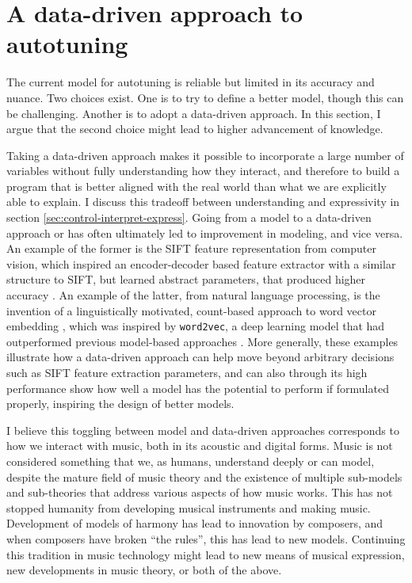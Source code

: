\section{A data-driven approach to autotuning}
\label{sec:pretheory}
The current model for autotuning is reliable but limited in its accuracy and nuance. Two choices exist. One is to try to define a better model, though this can be challenging. Another is to adopt a data-driven approach. In this section, I argue that the second choice might lead to higher advancement of knowledge. 

Taking a data-driven approach makes it possible to incorporate a large number of variables without fully understanding how they interact, and therefore to build a program that is better aligned with the real world than what we are explicitly able to explain. I discuss this tradeoff between understanding and expressivity in section \ref{sec:control-interpret-express}. Going from a model to a data-driven approach or has often ultimately led to improvement in modeling, and vice versa. An example of the former is the SIFT feature representation from computer vision, which inspired an encoder-decoder based feature extractor with a similar structure to SIFT, but learned abstract parameters, that produced higher accuracy \cite{zheng2017sift}. An example of the latter, from natural language processing, is the invention of a linguistically motivated, count-based approach to word vector embedding \cite{pennington2014glove}, which was inspired by \texttt{word2vec}, a deep learning model that had outperformed previous model-based approaches \cite{mikolov2013efficient}. More generally, these examples illustrate how a data-driven approach can help move beyond arbitrary decisions such as SIFT feature extraction parameters, and can also through its high performance show how well a model has the potential to perform if formulated properly, inspiring the design of better models.

I believe this toggling between model and data-driven approaches corresponds to how we interact with music, both in its acoustic and digital forms. Music is not considered something that we, as humans, understand deeply or can model, despite the mature field of music theory and the existence of multiple sub-models and sub-theories that address various aspects of how music works. This has not stopped humanity from developing musical instruments and making music. Development of models of harmony has lead to innovation by composers, and when composers have broken ``the rules'', this has lead to new models. Continuing this tradition in music technology might lead to new means of musical expression, new developments in music theory, or both of the above.

